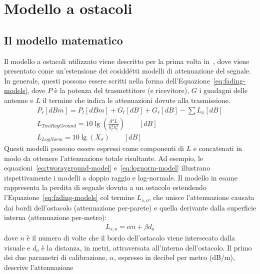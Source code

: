 
\chapter{Modello a ostacoli}\label{chap:modello-a-ostacoli}
%
\section{Il modello matematico}\label{sec:il-modello-matematico}{\vspace*{-.3\baselineskip}} %
Il modello a ostacoli utilizzato viene descritto per la prima volta in~\cite{5720204}, dove viene presentato
come un'estensione dei cosiddétti modelli di attenuazione del segnale.
In generale, questi possono essere scritti nella forma dell'Equazione~\ref{eq:fading-models}, dove $P$ è la potenza del trasmettitore (e ricevitore),
$G$ i guadagni delle antenne e $L$ il termine che indica le attenuazioni dovute alla trasmissione.
%
\begin{gather}
	P_r[dBm] = P_t[dBm] + G_t[dB] + G_r[dB] - \sum L_x[dB] 														\label{eq:fading-models} \\
	L_{TwoRayGround} = 10 \lg \left( \frac{d^4 L}{h^2_t h^2_t} \right)	\qquad [dB]		\label{eq:tworayground-model} \\
	L_{LogNorm} = 10 \lg \left( X_\sigma \right)	\qquad [dB]													\label{eq:lognorm-model}
\end{gather}
%
Questi modelli possono essere espressi come componenti di $L$ e concatenati in modo da ottenere l'attenuazione totale risultante.
Ad esempio, le equazioni~\ref{eq:tworayground-model} e~\ref{eq:lognorm-model} illustrano rispettivamente i modelli a doppio raggio e log-normale.
Il modello in esame rappresenta la perdita di segnale dovuta a un ostacolo estendendo l'Equazione~\ref{eq:fading-models}
col termine $L_{s,o}$, che unisce l'attenuazione causata dai bordi dell'ostacolo (attenuazione per-parete)
e quella derivante dalla superficie interna (attenuazione per-metro):
%
\begin{gather}\label{eq:osbtacle-model}
	L_{s,o} = \alpha n + \beta d_o
\end{gather}
dove $n$ è il numero di volte che il bordo dell'ostacolo viene intersecato dalla visuale e $d_o$ è la distanza, in metri, attraversata all'interno dell'ostacolo.
Il primo dei due parametri di calibrazione, $\alpha$, espresso in decibel per metro (dB/m), descrive l'attenuazione
